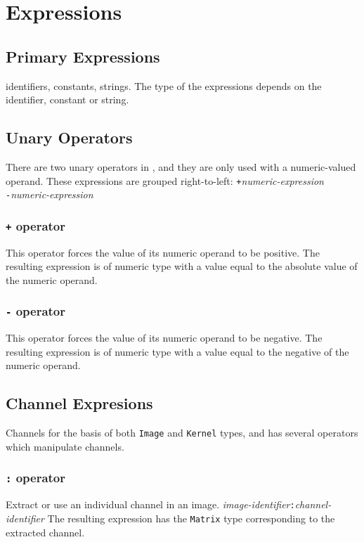 \section{Expressions}
\label{sec:expressions}

\subsection{Primary Expressions}
\label{ssec:primaryexpresions}
identifiers, constants, strings. The type of the expressions depends on the identifier, constant or string.

\subsection{Unary Operators}
\label{ssec:unaryoperators}
There are two unary operators in \sys{}, and they are only used with a
numeric-valued operand.
These expressions are grouped right-to-left:
\startsyn
\texttt{+}\emph{numeric-expression} \\
\texttt{-}\emph{numeric-expression}
\stopsyn

\subsubsection{\texttt{+} operator}
This operator forces the value of its numeric operand to be positive.
The resulting expression is of numeric type with a value equal to the
absolute value of the numeric operand.

\subsubsection{\texttt{-} operator}
This operator forces the value of its numeric operand to be negative.
The resulting expression is of numeric type with a value equal to the
negative of the numeric operand.

\subsection{Channel Expresions}
\label{ssec:channelexpressions}
Channels for the basis of both \texttt{Image} and \texttt{Kernel} types, and
\sys{} has several operators which manipulate channels.

\subsubsection{\texttt{:} operator}
\label{sssec:colonop}
Extract or use an individual channel in an image.
\startsyn
\emph{image-identifier}\texttt{:}\emph{channel-identifier}
\stopsyn
The resulting expression has the \texttt{Matrix} type corresponding to the
extracted channel.

